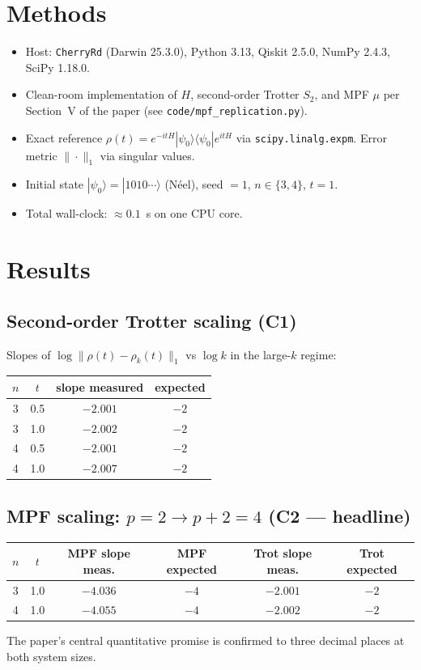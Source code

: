 \documentclass[11pt]{article}
\begin{document}
\section{Methods}
\begin{itemize}
\item Host: \texttt{CherryRd} (Darwin 25.3.0), Python 3.13, Qiskit 2.5.0, NumPy 2.4.3, SciPy 1.18.0.
\item Clean-room implementation of $H$, second-order Trotter $S_2$, and MPF $\mu$ per Section~V of
      the paper (see \texttt{code/mpf\_replication.py}).
\item Exact reference $\rho(t) = e^{-itH}|\psi_0\rangle\langle\psi_0|e^{itH}$ via
      \texttt{scipy.linalg.expm}. Error metric $\|\cdot\|_1$ via singular values.
\item Initial state $|\psi_0\rangle = |1010\cdots\rangle$ (N\'eel), seed $= 1$, $n \in \{3,4\}$, $t = 1$.
\item Total wall-clock: $\approx 0.1$~s on one CPU core.
\end{itemize}

\section{Results}

\subsection{Second-order Trotter scaling (C1)}
Slopes of $\log \|\rho(t) - \rho_k(t)\|_1$ vs $\log k$ in the large-$k$ regime:
\begin{center}
\begin{tabular}{cccc}
\toprule
$n$ & $t$ & slope measured & expected \\
\midrule
3 & 0.5 & $-2.001$ & $-2$ \\
3 & 1.0 & $-2.002$ & $-2$ \\
4 & 0.5 & $-2.001$ & $-2$ \\
4 & 1.0 & $-2.007$ & $-2$ \\
\bottomrule
\end{tabular}
\end{center}

\subsection{MPF scaling: $p=2 \to p+2=4$ (C2 --- headline)}
\begin{center}
\begin{tabular}{cccccc}
\toprule
$n$ & $t$ & MPF slope meas. & MPF expected & Trot slope meas. & Trot expected \\
\midrule
3 & 1.0 & $\mathbf{-4.036}$ & $-4$ & $-2.001$ & $-2$ \\
4 & 1.0 & $\mathbf{-4.055}$ & $-4$ & $-2.002$ & $-2$ \\
\bottomrule
\end{tabular}
\end{center}
The paper's central quantitative promise is confirmed to three decimal places at both system sizes.
\end{document}
